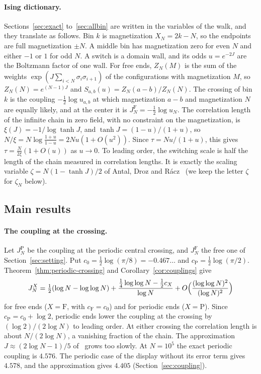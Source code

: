 \documentclass[11pt]{article}
\theoremstyle{definition}
\theoremstyle{remark}
\begin{document}
\paragraph{Ising dictionary.} Sections~\ref{sec:exact} to~\ref{sec:allbin}
are written in the variables of the walk, and they translate as follows.
Bin $k$ is magnetization $X_N=2k-N$, so the endpoints are full magnetization
$\pm N$. A middle bin has magnetization zero for even $N$ and either $-1$
or $1$ for odd $N$. A switch is a domain wall, and its odds $u=e^{-2J}$ are the
Boltzmann factor of one wall. For free ends, $Z_N(M)$ is the sum of the weights
$\exp(J\sum_{i<N}\sigma_i\sigma_{i+1})$ of the configurations with
magnetization $M$, so $Z_N(N)=e^{(N-1)J}$ and
$S_{a,b}(u)=Z_N(a-b)/Z_N(N)$. The crossing of bin $k$ is the coupling
$-\frac12\log u_{a,b}$ at which magnetization $a-b$ and
magnetization $N$ are equally likely, and at the center it is
$J_N^{\mathrm F}=-\frac12\log u_N$. The correlation length of the infinite
chain in zero field, with no constraint on the magnetization, is
$\xi(J)=-1/\log\tanh J$, and $\tanh J=(1-u)/(1+u)$, so
$N/\xi=N\log\frac{1+u}{1-u}=2Nu(1+O(u^2))$. Since $\tau=Nu/(1+u)$, this gives
$\tau=\frac N{2\xi}(1+O(u))$ as $u\to0$. To leading order, the switching scale is half the
length of the chain measured in correlation lengths. It is exactly the
scaling variable $\zeta=N(1-\tanh J)/2$ of Antal, Droz and
R\'acz~\cite{antal2004} (we keep the letter $\zeta$ for $\zeta_N$ below).

\subsection{Main results}

\paragraph{The coupling at the crossing.} Let $J_N^{\mathrm P}$ be the coupling at the periodic central crossing, and
$J_N^{\mathrm F}$ the free one of Section~\ref{sec:setting}. Put
$c_0=\frac12\log(\pi/8)=-0.467\ldots$ and $c_{\mathrm P}=\frac12\log(\pi/2)$.
Theorem~\ref{thm:periodic-crossing} and Corollary~\ref{cor:couplings} give
\[
J_N^X=\tfrac12(\log N-\log\log N)+\frac{\frac14\log\log N-\frac12c_X}{\log N}
+O\Bigl(\frac{(\log\log N)^2}{(\log N)^2}\Bigr)
\]
for free ends ($X=\mathrm F$, with $c_{\mathrm F}=c_0$) and for periodic ends
($X=\mathrm P$). Since
$c_{\mathrm P}=c_0+\log2$, periodic ends lower the coupling at the crossing by
$(\log2)/(2\log N)$ to leading order. At either crossing the correlation
length is about $N/(2\log N)$, a vanishing fraction of the chain. The
approximation $J\approx(2\log N-1)/5$ of~\cite[Eq.~(16)]{stepanyan2024}
grows too slowly. At $N=10^5$ the exact periodic coupling is $4.576$. The
periodic case of the display without its error term gives $4.578$, and the approximation gives
$4.405$ (Section~\ref{sec:coupling}).
\end{document}
